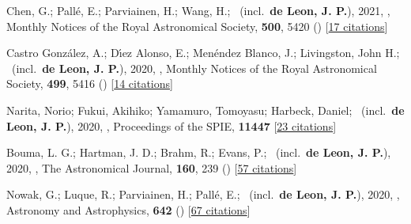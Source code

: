 \item[{\color{numcolor}\scriptsize32}] Chen, G.; Pall{\'e}, E.; Parviainen, H.; Wang, H.; \etal\ (incl.\ \textbf{de Leon, J. P.}), 2021, , Monthly Notices of the Royal Astronomical Society, \textbf{500}, 5420 () [\href{https://ui.adsabs.harvard.edu/abs/2021MNRAS.500.5420C}{17 citations}]

\item[{\color{numcolor}\scriptsize31}] Castro Gonz{\'a}lez, A.; D{\'\i}ez Alonso, E.; Men{\'e}ndez Blanco, J.; Livingston, John H.; \etal\ (incl.\ \textbf{de Leon, J. P.}), 2020, , Monthly Notices of the Royal Astronomical Society, \textbf{499}, 5416 () [\href{https://ui.adsabs.harvard.edu/abs/2020MNRAS.499.5416C}{14 citations}]

\item[{\color{numcolor}\scriptsize30}] Narita, Norio; Fukui, Akihiko; Yamamuro, Tomoyasu; Harbeck, Daniel; \etal\ (incl.\ \textbf{de Leon, J. P.}), 2020, , Proceedings of the SPIE, \textbf{11447} [\href{https://www.spiedigitallibrary.org/conference-proceedings-of-spie/10925/1092507/Focus-adjustable-motion-blur-compensation-method-using-deformable-mirror/10.1117/12.2509567.short}{23 citations}]

\item[{\color{numcolor}\scriptsize29}] Bouma, L. G.; Hartman, J. D.; Brahm, R.; Evans, P.; \etal\ (incl.\ \textbf{de Leon, J. P.}), 2020, , The Astronomical Journal, \textbf{160}, 239 () [\href{https://ui.adsabs.harvard.edu/abs/2020AJ....160..239B}{57 citations}]

\item[{\color{numcolor}\scriptsize28}] Nowak, G.; Luque, R.; Parviainen, H.; Pall{\'e}, E.; \etal\ (incl.\ \textbf{de Leon, J. P.}), 2020, , Astronomy and Astrophysics, \textbf{642} () [\href{https://ui.adsabs.harvard.edu/abs/2020A&A...642A.173N}{67 citations}]

